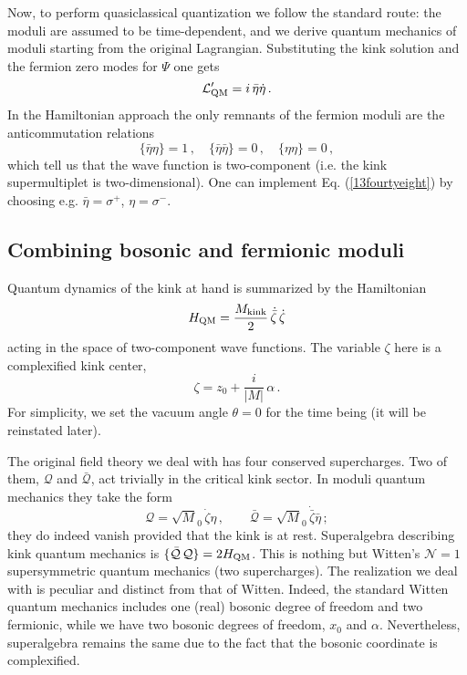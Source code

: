 \documentclass[epsfig,12pt]{article}
\def\beq{\begin{equation}}
\def\eeq{\end{equation}}
\def\beq{\begin{equation}}
\def\eeq{\end{equation}}
\begin{document}
Now, to
perform   quasiclassical quantization we follow the standard route:
the moduli are assumed to be   time-dependent, and we derive 
quantum mechanics of moduli starting from the original Lagrangian.
Substituting the kink solution   and the fermion zero modes for
$\Psi$ one gets
\beq
{\cal L}'_{\rm QM} = i\, \bar\eta\dot\eta\,.
\label{13fourtyseven}
\eeq
In the Hamiltonian approach the only remnants of the fermion moduli
are the anticommutation relations
\beq
\{\bar\eta\eta\} =1\,,\quad \{\bar\eta \bar\eta\} =0\,,\quad \{\eta \eta\} =0\,,
\label{13fourtyeight}
\eeq
which tell us that the wave function is two-component
(i.e. the kink supermultiplet is two-dimensional). One can implement
Eq. (\ref{13fourtyeight}) by choosing e.g. 
$\bar\eta=\sigma^+$, $ \eta=\sigma^-$.


\subsection{Combining bosonic and fermionic moduli}
\label{cbfm}

Quantum dynamics of the kink at hand is summarized by the
Hamiltonian
\beq
H_{\rm QM} =  \frac{M_{\rm kink}}{2}\,\dot{\bar\zeta}\, \dot\zeta
\label{13fourtynine}
\eeq
acting in the space of two-component wave functions.
The variable $\zeta$ here is a complexified kink center,
\beq
\zeta = z_0 + \frac{i}{|M|}\, \alpha\,.
\label{13fifty}
\eeq
For simplicity, we set the vacuum angle $\theta =0$ for the time being
(it will be reinstated later). 

The original field theory we deal with has four conserved supercharges.
Two of them, ${\mathcal Q}$ and $\bar {\mathcal Q}$, 
act trivially in the critical kink sector. In moduli quantum
mechanics they take the form
\beq
{\mathcal Q}= {\sqrt M_0}\,  \dot\zeta\eta\,,\qquad 
\bar {\mathcal Q}=  {\sqrt M_0}\, \dot{\bar\zeta}\bar \eta \, ;
\label{13fiftyone}
\eeq
they do indeed vanish provided that the kink is at rest.
Superalgebra describing kink quantum mechanics is
$\{\bar {\mathcal Q}\, {\mathcal Q}\} = 2 H_{\rm QM}$. This is nothing but 
Witten's ${\mathcal N}=1$
supersymmetric quantum mechanics  (two supercharges).
The realization we deal with is peculiar and distinct from 
that of Witten. Indeed, the standard Witten quantum mechanics
includes one (real) bosonic degree of freedom and two fermionic, while
we have two bosonic degrees of freedom,
$x_0$ and $\alpha$. Nevertheless, superalgebra remains the same
due to the fact that the bosonic coordinate is complexified.
 
\end{document}
